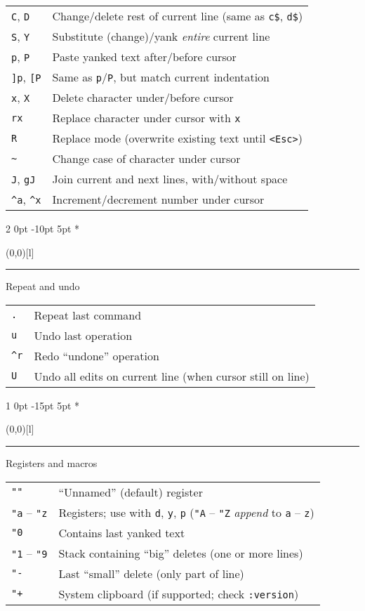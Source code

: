 \documentclass[a4paper, landscape, 10pt]{article}
\makeatletter
\renewcommand{\section}{%
    \@startsection{section}%
        {1}%
        {0pt}%
        {-15pt}%
        {5pt}%
        {\fontsize{14pt}{12pt}\fontseries{ub}\selectfont\color{accentcolor}}}
\renewcommand{\subsection}{%
    \@startsection{subsection}%
        {2}%
        {0pt}%
        {-10pt}%
        {5pt}%
        {\fontsize{12pt}{12pt}\selectfont\bfseries\itshape\color{accentcolor}}}
\newcommand{\V}[1]{\texttt{\textup{#1}}}
\newcommand{\topic}[1]{\section*{\protect\makebox(0,0)[l]{\color{accentcolor!80}\rule[8pt]{\columnwidth}{19pt}}\hspace{.5em}\color{white}#1}}
\newcommand{\subtopic}[1]{\subsection*{\protect\makebox(0,0)[l]{\color{accentcolor!20}\rule[7pt]{\columnwidth}{19pt}}\hspace{.5em}#1}}
\makeatother
\begin{document}
\begin{multicols*}{3}
    \begin{tabularx}{\columnwidth}{l>{\raggedright\arraybackslash}X}
\V{C}, \V{D}
        &Change/delete rest of current line (same as \verb|c$|, \verb|d$|)\\
\V{S}, \V{Y}
        &Substitute (change)/yank \emph{entire} current line\\
\V{p}, \V{P}
        &Paste yanked text after/before cursor\\
\V{]p}, \V{[P}
        &Same as \V{p}/\V{P}, but match current indentation\\
\V{x}, \V{X}
        &Delete character under/before cursor\\
\V{rx}
        &Replace character under cursor with \V{x}\\
\V{R}
        &Replace mode (overwrite existing text until \V{<Esc>})\\
\verb|~|
        &Change case of character under cursor\\
\V{J}, \V{gJ}
        &Join current and next lines, with/without space\\
\verb|^a|, \verb|^x|
        &Increment/decrement number under cursor
    \end{tabularx}

\subtopic{Repeat and undo}
    \begin{tabularx}{\columnwidth}{l>{\raggedright\arraybackslash}X}
\verb|.|
        &Repeat last command\\
\verb|u|
        &Undo last operation\\
\verb|^r|
        &Redo ``undone'' operation\\
\verb|U|
        &Undo all edits on current line (when cursor still on line)
    \end{tabularx}



\topic{Registers and macros}
    \begin{tabularx}{\columnwidth}{l>{\raggedright\arraybackslash}X}
\V{""}
        &``Unnamed'' (default) register\\
\V{"a} – \V{"z}
        &Registers; use with \V{d}, \V{y}, \V{p} (\V{"A} – \V{"Z} \emph{append} to \V{a} – \V{z})\\
\V{"0}
        &Contains last yanked text\\
\V{"1} – \V{"9}
        &Stack containing ``big'' deletes (one or more lines)\\
\V{"-}
        &Last ``small'' delete (only part of line)\\
\V{"+}
        &System clipboard (if supported; check \V{:version})\\


\end{tabularx}
\end{multicols*}
\end{document}
